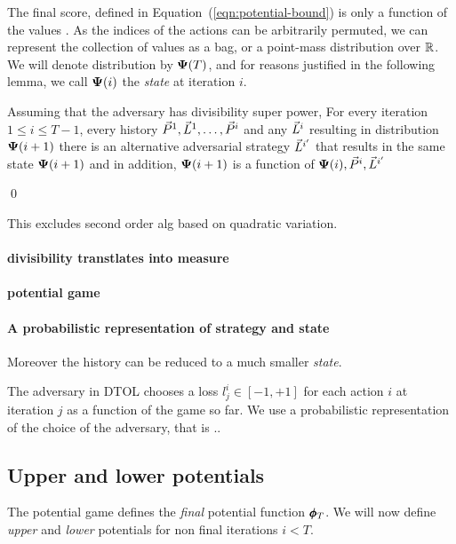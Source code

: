 \documentclass{article}[12pt]
\begin{document}
The final score, defined in Equation~(\ref{eqn:potential-bound}) is
only a function of the values .  As the
indices of the actions can be arbitrarily permuted, we can represent
the collection of values as a bag, or a point-mass distribution over
$\mathbb{R}$. We will denote distribution by ${\bf \Psi}(T)$, and for reasons justified in the following lemma, we call ${\bf \Psi}(i)$ the {\em state} at iteration $i$. 

\begin{lemma}
  Assuming that the adversary has divisibility super power, For every
  iteration $1\leq i \leq T-1$, every history
  $\vec{P}^{1},\vec{L}^{1},\ldots,\vec{P}^{i}$ and any $\vec{L}^{i}$ resulting in
  distribution ${\bf \Psi}(i+1)$ there is an alternative adversarial
  strategy $\vec{L}^{i'}$ that results in the same state ${\bf \Psi}(i+1)$
  and in addition, ${\bf \Psi}(i+1)$ is a function of
  ${\bf \Psi}(i),\vec{P}^{i},\vec{L}^{i'}$
\end{lemma}

\proof
\qed

This excludes second order alg based on quadratic variation.


\paragraph*{divisibility transtlates into measure}

\paragraph*{potential game}

\paragraph*{A probabilistic representation of strategy and state}


  Moreover the history can be reduced to a much smaller {\em state}.



The adversary in DTOL chooses a loss $l_j^i \in [-1,+1]$ for each action $i$ at
iteration $j$ as a function of the game so far. We use a probabilistic
representation of the choice of the adversary, that is ..

\subsection{Upper and lower potentials} \label{sec:potentialRecursion}

The potential game defines the {\em final} potential function
$\pmb{\phi}_{T}$. We will now define {\em upper} and {\em lower}
potentials for non final iterations $i < T$.
\end{document}
